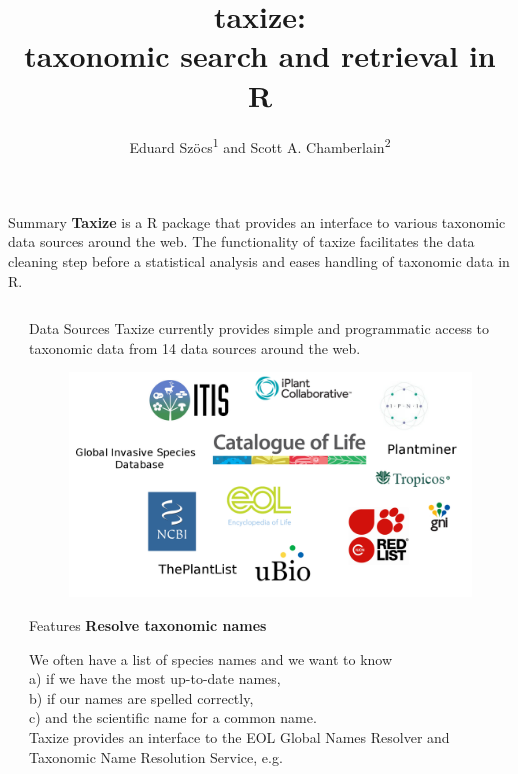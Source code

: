 \documentclass[final,t]{beamer}\usepackage[]{graphicx}\usepackage[]{color}
\title{taxize: \\[0.2em] taxonomic search and retrieval in R}
\author{Eduard Szöcs\textsuperscript{1} and Scott A. Chamberlain\textsuperscript{2}}
\institute{\textsuperscript{1}University of Koblenz-Landau, \textsuperscript{2}Simon Fraser University}
\begin{document}
  \begin{frame}[fragile]

		\begin{block}{\Large Summary}
    \Large \textcolor{i6bluedark}{\textbf{Taxize}} is a R package that provides an interface to various taxonomic data sources around the web.
    The functionality of taxize facilitates the data cleaning step before a statistical analysis and eases handling of taxonomic data in R.
		\end{block}

	\begin{columns}[t]
		\begin{column}{0.01\linewidth}
		\end{column}

		\begin{column}{.49\linewidth}
			\vspace{-\baselineskip}  %
			\begin{block}{Data Sources}
        Taxize currently provides simple and programmatic access to taxonomic data from 14 data sources around the web.
				\begin{figure}
					\includegraphics[width=0.8\linewidth]{fig/sources.png}
					\label{fig:sources}
				\end{figure}
			\end{block}

			\begin{block}{Features}
				\textcolor{i6bluedark}{\textbf{\large Resolve taxonomic names}}
        \vspace{0.5em}
        \par
        \begingroup
        \leftskip=2cm
        \noindent 
          We often have a list of species names and we want to know \\
          a) if we have the most up-to-date names, \\
          b) if our names are spelled correctly,  \\
          c) and the scientific name for a common name.\\
          Taxize provides an interface to the EOL Global Names Resolver and Taxonomic Name Resolution Service, e.g.
        \par
        \endgroup


\end{block}
\end{column}
\end{columns}
\end{frame}
\end{document}
